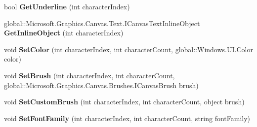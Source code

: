 \begin{DoxyCompactItemize}
\item 
\mbox{\label{class_microsoft_1_1_graphics_1_1_canvas_1_1_text_1_1_canvas_text_layout_af3519becd05a01693db79181913fc3c2}} 
bool {\bfseries Get\+Underline} (int character\+Index)
\item 
\mbox{\label{class_microsoft_1_1_graphics_1_1_canvas_1_1_text_1_1_canvas_text_layout_a6ff3475276bd3f81526b7bdfe692a997}} 
global\+::\+Microsoft.\+Graphics.\+Canvas.\+Text.\+I\+Canvas\+Text\+Inline\+Object {\bfseries Get\+Inline\+Object} (int character\+Index)
\item 
\mbox{\label{class_microsoft_1_1_graphics_1_1_canvas_1_1_text_1_1_canvas_text_layout_a65a724ca04e36e5f0da7f80d7504de49}} 
void {\bfseries Set\+Color} (int character\+Index, int character\+Count, global\+::\+Windows.\+U\+I.\+Color color)
\item 
\mbox{\label{class_microsoft_1_1_graphics_1_1_canvas_1_1_text_1_1_canvas_text_layout_a164e35e922e29d39c04fdf4a859201ff}} 
void {\bfseries Set\+Brush} (int character\+Index, int character\+Count, global\+::\+Microsoft.\+Graphics.\+Canvas.\+Brushes.\+I\+Canvas\+Brush brush)
\item 
\mbox{\label{class_microsoft_1_1_graphics_1_1_canvas_1_1_text_1_1_canvas_text_layout_a9ac1050fa038c2c1ebceaa61d479feb0}} 
void {\bfseries Set\+Custom\+Brush} (int character\+Index, int character\+Count, object brush)
\item 
\mbox{\label{class_microsoft_1_1_graphics_1_1_canvas_1_1_text_1_1_canvas_text_layout_ad4c9f30ce630b285c5de4328a5697eef}} 
void {\bfseries Set\+Font\+Family} (int character\+Index, int character\+Count, string font\+Family)
\item 
\mbox{\label{class_microsoft_1_1_graphics_1_1_canvas_1_1_text_1_1_canvas_text_layout_a2bd8d5f600cfc5fd4da25693e6735264}} 

\end{DoxyCompactItemize}
